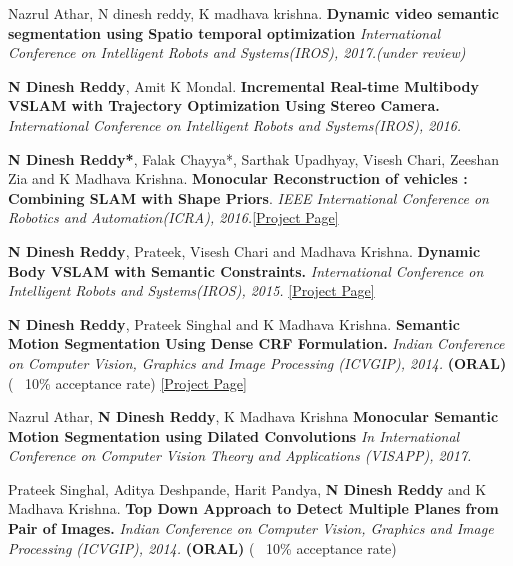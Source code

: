 \documentclass[a4paper,10pt]{article}
\begin{document}
\vspace{-2 mm}
Nazrul Athar, N dinesh reddy, K madhava krishna. \textbf{Dynamic video semantic segmentation using Spatio temporal
      optimization} {\sl International Conference on Intelligent Robots and Systems(IROS), 2017.(under review)}


\textbf{N Dinesh Reddy}, Amit K Mondal. \textbf{Incremental Real-time Multibody VSLAM with Trajectory Optimization Using Stereo Camera.} {\sl International Conference on Intelligent Robots and Systems(IROS), 2016.}


\textbf{N Dinesh Reddy*}, Falak Chayya*, Sarthak Upadhyay, Visesh Chari, Zeeshan Zia and K Madhava Krishna. \textbf{Monocular Reconstruction of vehicles : Combining SLAM with Shape Priors}. {\sl IEEE International Conference on Robotics and Automation(ICRA), 2016.}\href{http://robotics.iiit.ac.in/people/falak.chhaya/Monocular_Reconstruction_of_Vehicles.html}{[Project Page]}


\textbf{N Dinesh Reddy}, Prateek, Visesh Chari and Madhava Krishna. \textbf{Dynamic Body VSLAM with Semantic Constraints.} {\sl International Conference on Intelligent Robots and Systems(IROS), 2015.} \href{https://researchweb.iiit.ac.in/~dineshreddy.n/zerotype/projects/DB-VSLAM/}{[Project Page]}


\textbf{N Dinesh Reddy}, Prateek Singhal and K Madhava Krishna. \textbf{Semantic Motion Segmentation Using Dense CRF Formulation.} {\sl Indian Conference on Computer Vision, Graphics and Image Processing (ICVGIP), 2014.} \textbf{(ORAL)} (~ 10\% acceptance rate) \href{https://researchweb.iiit.ac.in/~dineshreddy.n/zerotype/projects/SMS/} {[Project Page]}
 
  Nazrul Athar, \textbf{N Dinesh Reddy}, K Madhava Krishna \textbf{Monocular Semantic Motion Segmentation using Dilated
Convolutions} {\sl In  International Conference on Computer Vision Theory and Applications (VISAPP), 2017.}

 Prateek Singhal, Aditya Deshpande, Harit Pandya, \textbf{N Dinesh Reddy} and K Madhava Krishna. \textbf{Top Down Approach to Detect Multiple Planes from Pair of Images.} {\sl Indian Conference on Computer Vision, Graphics and Image Processing (ICVGIP), 2014.} \textbf{(ORAL)}  (~ 10\% acceptance rate)
 
\newpage
 
\end{document}
